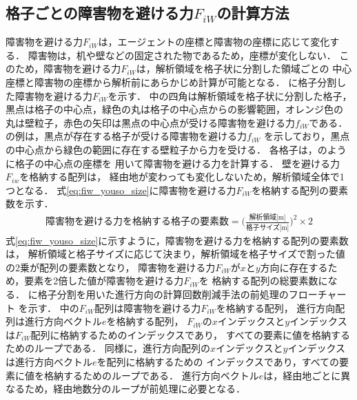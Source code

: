 

\subsection{格子ごとの障害物を避ける力$F_{iW}$の計算方法}
障害物を避ける力$F_{iW}$は，エージェントの座標と障害物の座標に応じて変化する．
障害物は，机や壁などの固定された物であるため，座標が変化しない．
このため，障害物を避ける力$F_{iW}$は，解析領域を格子状に分割した領域ごとの
中心座標と障害物の座標から解析前にあらかじめ計算が可能となる．
に格子分割した障害物を避ける力$F_{iW}$を示す．
中の四角は解析領域を格子状に分割した格子，
黒点は格子の中心点，緑色の丸は格子の中心点からの影響範囲，オレンジ色の
丸は壁粒子，赤色の矢印は黒点の中心点が受ける障害物を避ける力$f_{iW}$である．
の例は，黒点が存在する格子が受ける障害物を避ける力$f_{iW}$
を示しており，黒点の中心点から緑色の範囲に存在する壁粒子から力を受ける．
各格子は，のように格子の中心点の座標を
用いて障害物を避ける力を計算する．
壁を避ける力$F_{iw}$を格納する配列は，
経由地が変わっても変化しないため，解析領域全体で1つとなる．
式\eqref{eq:fiw_youso_size}に障害物を避ける力$F_{iW}$を格納する配列の要素数を示す．
%
\begin{eqnarray}
 \mbox{障害物を避ける力を格納する格子の要素数} =  \Big( \frac{\mbox{解析領域[m]}}{\mbox{格子サイズ[m]}} \Big) ^ 2 \times 2
 \label{eq:fiw_youso_size}
\end{eqnarray}
%
式\eqref{eq:fiw_youso_size}に示すように，障害物を避ける力を格納する配列の要素数は，
解析領域と格子サイズに応じて決まり，解析領域を格子サイズで割った値の2乗が配列の要素数となり，
障害物を避ける力$F_{iW}$が$x$と$y$方向に存在するため，要素を2倍した値が障害物を避ける力$F_{iW}$を
格納する配列の総要素数になる．
に格子分割を用いた進行方向の計算回数削減手法の前処理のフローチャート
を示す．
中の$F_{iW}$配列は障害物を避ける力$F_{iW}$を格納する配列，
進行方向配列は進行方向ベクトル$e$を格納する配列，
$F_{iW}$の$x$インデックスと$y$インデックスは$F_{iW}$配列に格納するためのインデックスであり，
すべての要素に値を格納するためのループである．
同様に，進行方向配列の$x$インデックスと$y$インデックスは進行方向ベクトル$e$を配列に格納するための
インデックスであり，すべての要素に値を格納するためのループである．
進行方向ベクトル$e$は，経由地ごとに異なるため，経由地数分のループが前処理に必要となる．


